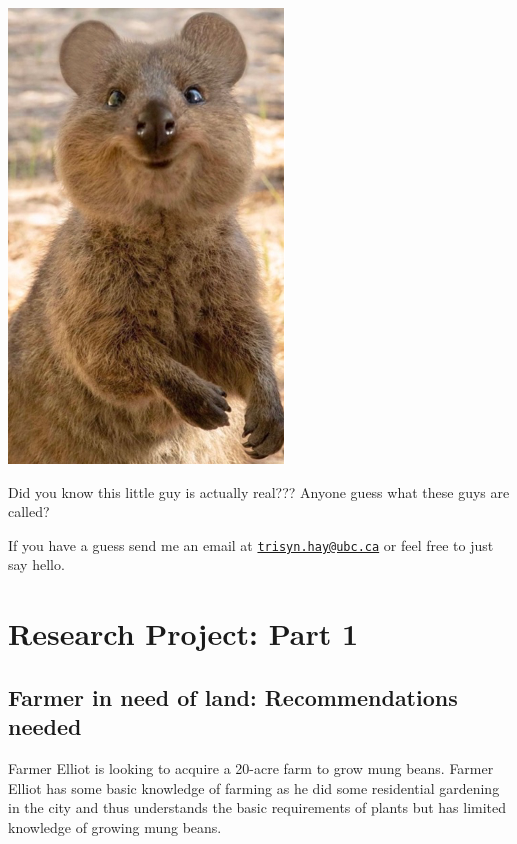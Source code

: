 \documentclass[
]{book}
\begin{document}
\includegraphics{images/img-1.png}

Did you know this little guy is actually real??? Anyone guess what these guys are called?

If you have a guess send me an email at \href{mailto:trisyn.hay@ubc.ca}{\nolinkurl{trisyn.hay@ubc.ca}} or feel free to just say hello.

\hypertarget{research-project-part-1}{%
\chapter*{Research Project: Part 1}\label{research-project-part-1}}

\hypertarget{farmer-in-need-of-land-recommendations-needed}{%
\section*{Farmer in need of land: Recommendations needed}\label{farmer-in-need-of-land-recommendations-needed}}

Farmer Elliot is looking to acquire a 20-acre farm to grow mung beans. Farmer Elliot has some basic knowledge of farming as he did some residential gardening in the city and thus understands the basic requirements of plants but has limited knowledge of growing mung beans.
\end{document}
